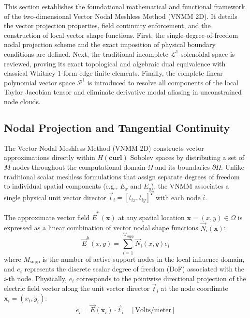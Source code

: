 \documentclass[preprint,12pt]{elsarticle}
\begin{document}
This section establishes the foundational mathematical and functional framework of the two-dimensional Vector Nodal Meshless Method (VNMM 2D). It details the vector projection properties, field continuity enforcement, and the construction of local vector shape functions. First, the single-degree-of-freedom nodal projection scheme and the exact imposition of physical boundary conditions are defined. Next, the traditional incomplete $\mathcal{L}^1$ solenoidal space is reviewed, proving its exact topological and algebraic dual equivalence with classical Whitney 1-form edge finite elements. Finally, the complete linear polynomial vector space $\mathcal{P}^1$ is introduced to resolve all components of the local Taylor Jacobian tensor and eliminate derivative modal aliasing in unconstrained node clouds.

\subsection{Nodal Projection and Tangential Continuity}
\label{subsec:nodal_projection}

The Vector Nodal Meshless Method (VNMM 2D) \cite{ortiz2021nodal, ortiz2023tese} constructs vector approximations directly within $H(\mathbf{curl})$ Sobolev spaces by distributing a set of $M$ nodes throughout the computational domain $\Omega$ and its boundaries $\partial\Omega$. Unlike traditional scalar meshless formulations that assign separate degrees of freedom to individual spatial components (e.g., $E_x$ and $E_y$), the VNMM associates a single physical unit vector director $\vec{t}_i = [t_{ix}, t_{iy}]^T$ with each node $i$.

The approximate vector field $\vec{E}^h(\mathbf{x})$ at any spatial location $\mathbf{x} = (x, y) \in \Omega$ is expressed as a linear combination of vector nodal shape functions $\vec{N}_i(\mathbf{x})$:
\begin{equation}
\vec{E}^h(x, y) = \sum_{i=1}^{M_{\text{supp}}} \vec{N}_i(x, y) e_i
\label{eq:field_approx_vnmm}
\end{equation}
where $M_{\text{supp}}$ is the number of active support nodes in the local influence domain, and $e_i$ represents the discrete scalar degree of freedom (DoF) associated with the $i$-th node. Physically, $e_i$ corresponds to the pointwise directional projection of the electric field vector along the unit vector director $\vec{t}_i$ at the node coordinate $\mathbf{x}_i = (x_i, y_i)$:
\begin{equation}
e_i = \vec{E}(\mathbf{x}_i) \cdot \vec{t}_i \quad [\text{Volts/meter}]
\label{eq:dof_projection_definition}
\end{equation}
\end{document}
